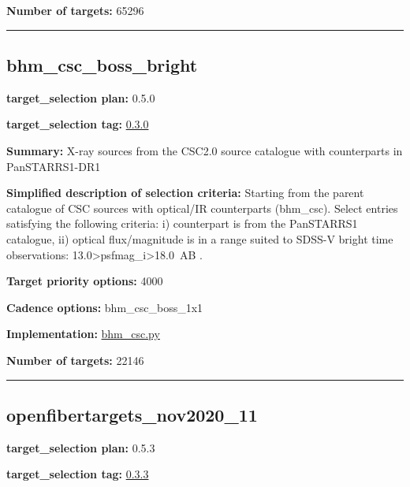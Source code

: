 \noindent\textbf{Number of targets:} 65296

\begin{center}\rule{0.5\linewidth}{0.5pt}\end{center}

\hypertarget{bhm_csc_boss_bright_plan0.5.0}{%
\subsection{bhm\_csc\_boss\_bright}\label{bhm_csc_boss_bright_plan0.5.0}}

\noindent\textbf{target\_selection plan:} 0.5.0

\noindent\textbf{target\_selection tag:}
\href{https://github.com/sdss/target_selection/tree/0.3.0/}{0.3.0}

\noindent\textbf{Summary:} X-ray sources from the CSC2.0 source catalogue with
counterparts in PanSTARRS1-DR1

\noindent\textbf{Simplified description of selection criteria:} Starting from the
parent catalogue of CSC sources with optical/IR counterparts (bhm\_csc).
Select entries satisfying the following criteria: i) counterpart is from
the PanSTARRS1 catalogue, ii) optical flux/magnitude is in a range
suited to SDSS-V bright time observations:
13.0\textgreater psfmag\_i\textgreater18.0~AB .


\noindent\textbf{Target priority options:} 4000

\noindent\textbf{Cadence options:} bhm\_csc\_boss\_1x1

\noindent\textbf{Implementation:}
\href{https://github.com/sdss/target_selection/blob/0.3.0/python/target_selection/cartons/bhm_csc.py}{bhm\_csc.py}

\noindent\textbf{Number of targets:} 22146

\begin{center}\rule{0.5\linewidth}{0.5pt}\end{center}

\hypertarget{openfibertargets_nov2020_11_plan0.5.3}{%
\subsection{openfibertargets\_nov2020\_11}\label{openfibertargets_nov2020_11_plan0.5.3}}

\noindent\textbf{target\_selection plan:} 0.5.3

\noindent\textbf{target\_selection tag:}
\href{https://github.com/sdss/target_selection/tree/0.3.3/}{0.3.3}


